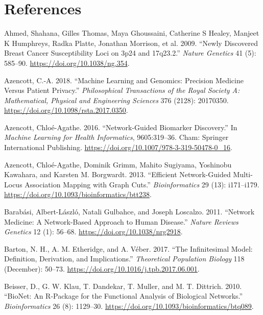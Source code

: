 \documentclass[
  11pt,
]{env/yjiao}
\newlength{\cslhangindent}
\newenvironment{cslreferences}%
  {\setlength{\parindent}{0pt}%
  \everypar{\setlength{\hangindent}{\cslhangindent}}\ignorespaces}%
  {\par}
\begin{document}
\hypertarget{references}{%
\chapter*{References}\label{references}}

\hypertarget{refs}{}
\begin{cslreferences}
\leavevmode\hypertarget{ref-search_newly_2009}{}%
Ahmed, Shahana, Gilles Thomas, Maya Ghoussaini, Catherine S Healey, Manjeet K Humphreys, Radka Platte, Jonathan Morrison, et al. 2009. ``Newly Discovered Breast Cancer Susceptibility Loci on 3p24 and 17q23.2.'' \emph{Nature Genetics} 41 (5): 585--90. \url{https://doi.org/10.1038/ng.354}.

\leavevmode\hypertarget{ref-azencott_machine_2018}{}%
Azencott, C.-A. 2018. ``Machine Learning and Genomics: Precision Medicine Versus Patient Privacy.'' \emph{Philosophical Transactions of the Royal Society A: Mathematical, Physical and Engineering Sciences} 376 (2128): 20170350. \url{https://doi.org/10.1098/rsta.2017.0350}.

\leavevmode\hypertarget{ref-azencott_network-guided_2016}{}%
Azencott, Chloé-Agathe. 2016. ``Network-Guided Biomarker Discovery.'' In \emph{Machine Learning for Health Informatics}, 9605:319--36. Cham: Springer International Publishing. \url{https://doi.org/10.1007/978-3-319-50478-0_16}.

\leavevmode\hypertarget{ref-azencott_efficient_2013}{}%
Azencott, Chloé-Agathe, Dominik Grimm, Mahito Sugiyama, Yoshinobu Kawahara, and Karsten M. Borgwardt. 2013. ``Efficient Network-Guided Multi-Locus Association Mapping with Graph Cuts.'' \emph{Bioinformatics} 29 (13): i171--i179. \url{https://doi.org/10.1093/bioinformatics/btt238}.

\leavevmode\hypertarget{ref-barabasi_network_2011}{}%
Barabási, Albert-László, Natali Gulbahce, and Joseph Loscalzo. 2011. ``Network Medicine: A Network-Based Approach to Human Disease.'' \emph{Nature Reviews Genetics} 12 (1): 56--68. \url{https://doi.org/10.1038/nrg2918}.

\leavevmode\hypertarget{ref-barton_infinitesimal_2017}{}%
Barton, N. H., A. M. Etheridge, and A. Véber. 2017. ``The Infinitesimal Model: Definition, Derivation, and Implications.'' \emph{Theoretical Population Biology} 118 (December): 50--73. \url{https://doi.org/10.1016/j.tpb.2017.06.001}.

\leavevmode\hypertarget{ref-beisser_bionet:_2010}{}%
Beisser, D., G. W. Klau, T. Dandekar, T. Muller, and M. T. Dittrich. 2010. ``BioNet: An R-Package for the Functional Analysis of Biological Networks.'' \emph{Bioinformatics} 26 (8): 1129--30. \url{https://doi.org/10.1093/bioinformatics/btq089}.


\end{cslreferences}
\end{document}
